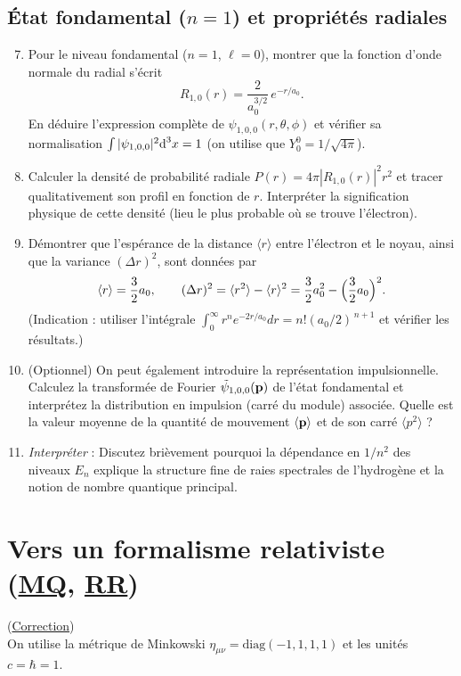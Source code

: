 \documentclass[a4paper,10pt]{report}
\begin{document}
\subsection{État fondamental ($n=1$) et propriétés radiales}
\begin{enumerate}
	\setcounter{enumi}{6}
	\item Pour le niveau fondamental ($n=1$, $\ell=0$), montrer que la fonction d'onde normale du radial s'écrit 
	\[
	R_{1,0}(r) = \frac{2}{a_0^{3/2}}\,e^{-r/a_0}.
	\]
	En déduire l'expression complète de $\psi_{1,0,0}(r,\theta,\phi)$ et vérifier sa normalisation $\int |\psi_{1,0,0}|^2 \text d^3x = 1$ (on utilise que $Y_{0}^{0}=1/\sqrt{4\pi}$). 
	\item Calculer la densité de probabilité radiale $P(r)=4\pi |R_{1,0}(r)|^2 r^2$ et tracer qualitativement son profil en fonction de $r$. Interpréter la signification physique de cette densité (lieu le plus probable où se trouve l'électron). 
	\item Démontrer que l'espérance de la distance $\langle r \rangle$ entre l'électron et le noyau, ainsi que la variance $(\Delta r)^2$, sont données par 
	\[
	\langle r \rangle = \frac{3}{2} a_0, 
	\qquad (\Delta r)^2 = \langle r^2 \rangle - \langle r \rangle^2 = \frac{3}{2}a_0^2 - \Bigl(\frac{3}{2}a_0\Bigr)^2.
	\]
	(Indication : utiliser l'intégrale $\int_0^\infty r^n e^{-2r/a_0}dr = n! (a_0/2)^{\,n+1}$ et vérifier les résultats.) 
	\item (Optionnel) On peut également introduire la représentation impulsionnelle. Calculez la transformée de Fourier $\tilde\psi_{1,0,0}(\vb{p})$ de l'état fondamental et interprétez la distribution en impulsion (carré du module) associée. Quelle est la valeur moyenne de la quantité de mouvement $\langle \vb{p}\rangle$ et de son carré $\langle p^2\rangle$ ?
	\item \emph{Interpréter} : Discutez brièvement pourquoi la dépendance en $1/n^2$ des niveaux $E_n$ explique la structure fine de raies spectrales de l'hydrogène et la notion de nombre quantique principal.
\end{enumerate}

\newpage \section[Vers un formalisme relativiste $\triangle$]{Vers un formalisme relativiste (\hyperref[subsubsec:quantique]{MQ}, \hyperref[subsubsec:relativite]{RR}) \space \faStar\faStar\faStar\faStar\faStar}\label{subsec:Dirac}
(\hyperref[subsec:correctionDirac]{Correction})\\
On utilise la métrique de Minkowski $\eta_{\mu\nu}=\mathrm{diag}(-1,1,1,1)$ et les unités $c=\hbar=1$. 
\end{document}
